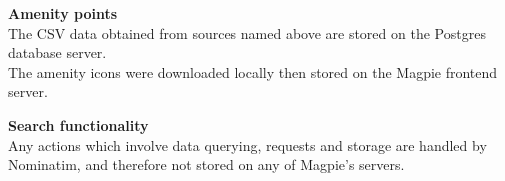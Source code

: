 \textbf{Amenity points}\\
The CSV data obtained from sources named above are stored on the Postgres database server.\\
The amenity icons were downloaded locally then stored on the Magpie frontend server.

\textbf{Search functionality}\\
Any actions which involve data querying, requests and storage are handled by Nominatim, and therefore not stored on any of Magpie's servers.
